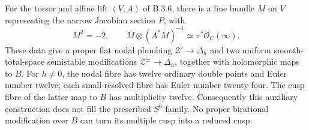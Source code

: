 \begin{proposition}\label{push:B37}
For the torsor and affine lift $(V,A)$
of B.3.6, there is a line bundle $M$ on
$V$ representing the narrow Jacobian
section $P$, with
\[
 M^2=-2,\qquad
 M\otimes(A^*M)^{-1}
       \simeq\pi^*\mathcal O_C(\infty).
\]
These data give a proper flat nodal
plumbing $\mathcal Z^\flat\to\Delta_h$
and two uniform smooth-total-space
semistable modifications
$\mathcal Z^\pm\to\Delta_h$, together
with holomorphic maps to $B$.
For $h\ne0$, the nodal fibre has
twelve ordinary double points and
Euler number twelve; each small-resolved
fibre has Euler number twenty-four.
The cusp fibre of the latter map to
$B$ has multiplicity twelve.
Consequently this auxiliary construction
does not fill the prescribed $S^6$
family. No proper birational modification
over $B$ can turn its multiple cusp
into a reduced cusp.
\end{proposition}
